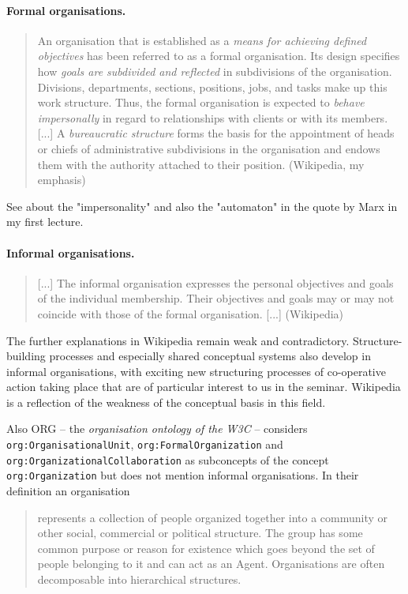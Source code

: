 \documentclass[11pt,a4paper]{article}
\begin{document}
\paragraph{Formal organisations.}
\begin{quote}
  An organisation that is established as a \emph{means for achieving defined
    objectives} has been referred to as a formal organisation. Its design
  specifies how \emph{goals are subdivided and reflected} in subdivisions of
  the organisation. Divisions, departments, sections, positions, jobs, and
  tasks make up this work structure. Thus, the formal organisation is expected
  to \emph{behave impersonally} in regard to relationships with clients or
  with its members. [...] A \emph{bureaucratic structure} forms the basis for
  the appointment of heads or chiefs of administrative subdivisions in the
  organisation and endows them with the authority attached to their position.
  (Wikipedia, my emphasis)
\end{quote}
See about the "impersonality" and also the "automaton" in the quote by Marx in
my first lecture.

\paragraph{Informal organisations.}
\begin{quote}
  [...] The informal organisation expresses the personal objectives and goals
  of the individual membership. Their objectives and goals may or may not
  coincide with those of the formal organisation. [...] (Wikipedia)
\end{quote}
The further explanations in Wikipedia remain weak and contradictory.
Structure-building processes and especially shared conceptual systems also
develop in informal organisations, with exciting new structuring processes
of co-operative action taking place that are of particular interest to us in
the seminar. Wikipedia is a reflection of the weakness of the conceptual basis
in this field.

Also ORG -- the \emph{organisation ontology of the W3C} \cite{vocab-org} --
considers \texttt{org:OrganisationalUnit}, \texttt{org:FormalOrganization} and
\texttt{org:OrganizationalCollaboration} as subconcepts of the concept
\texttt{org:Organization} but does not mention informal organisations.  In
their definition an organisation
\begin{quote}
  represents a collection of people organized together into a community or
  other social, commercial or political structure. The group has some common
  purpose or reason for existence which goes beyond the set of people
  belonging to it and can act as an Agent. Organisations are often
  decomposable into hierarchical structures.~\cite{vocab-org}
\end{quote}
\end{document}

